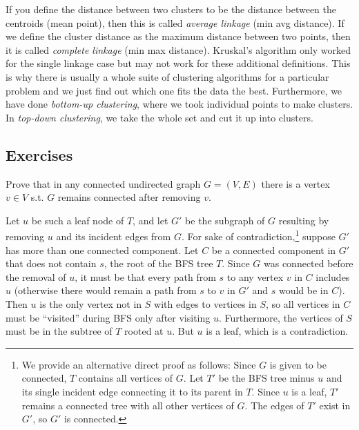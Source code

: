     If you define the distance between two clusters to be the distance between the centroids (mean point), then this is called \textit{average linkage} (min avg distance). If we define the cluster distance as the maximum distance between two points, then it is called \textit{complete linkage} (min max distance). Kruskal's algorithm only worked for the single linkage case but may not work for these additional definitions. This is why there is usually a whole suite of clustering algorithms for a particular problem and we just find out which one fits the data the best. Furthermore, we have done \textit{bottom-up clustering}, where we took individual points to make clusters. In \textit{top-down clustering}, we take the whole set and cut it up into clusters.  

\subsection{Exercises}

  \begin{exercise}
    Prove that in any connected undirected graph $G = (V, E)$ there is a vertex $v \in V$ s.t. $G$ remains connected after removing $v$. 
  \end{exercise}
  \begin{solution}
    Let $u$ be such a leaf node of $T$, and let $G'$ be the subgraph of $G$ resulting by removing $u$ and its incident edges from $G$.
    For sake of contradiction,\footnote{We provide an alternative direct proof as follows: Since $G$ is given to be connected, $T$ contains all vertices of $G$. Let $T'$ be the BFS tree minus $u$ and its single incident edge connecting it to its parent in $T$. Since $u$ is a leaf, $T'$ remains a connected tree with all other vertices of $G$. The edges of $T'$ exist in $G'$, so $G'$ is connected.} suppose $G'$ has more than one connected component.
    Let $C$ be a connected component in $G'$ that does not contain $s$, the root of the BFS tree $T$.
    Since $G$ was connected before the removal of $u$, it must be that every path from $s$ to any vertex $v$ in $C$ includes $u$ (otherwise there would remain a path from $s$ to $v$ in $G'$ and $s$ would be in $C$).
    Then $u$ is the only vertex not in $S$ with edges to vertices in $S$, so all vertices in $C$ must be ``visited'' during BFS only after visiting $u$. Furthermore, the vertices of $S$ must be in the subtree of $T$ rooted at $u$. But $u$ is a leaf, which is a contradiction.
  \end{solution}

